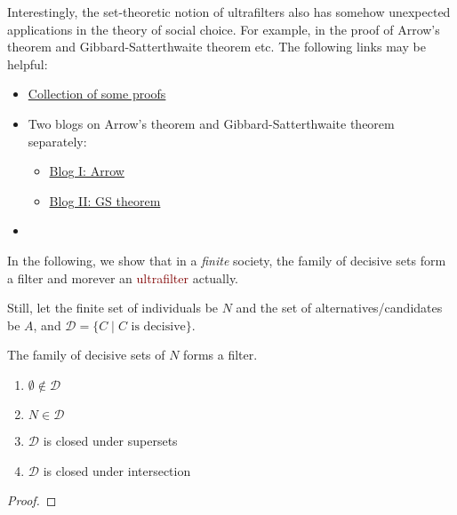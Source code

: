 Interestingly, the set-theoretic notion of ultrafilters also has somehow unexpected applications in the theory of social choice. For example, in the proof of Arrow's theorem and Gibbard-Satterthwaite theorem etc. The following links may be helpful:
\begin{itemize}
    \item \href{https://math.stackexchange.com/questions/585110/arrows-impossibility-theorem-and-ultrafilters-references}{Collection of some proofs}
    \item Two blogs on Arrow's theorem and Gibbard-Satterthwaite theorem separately:
    \begin{itemize}
        \item \href{https://algorithmicallyincompressible.wordpress.com/2009/08/11/ultrafilters-and-social-choice/#more-95}{Blog I: Arrow}
        \item \href{https://algorithmicallyincompressible.wordpress.com/2009/11/05/ultrafilters-and-social-choice-ii/}{Blog II: GS theorem}
    \end{itemize}
    \item 
\end{itemize}
In the following, we show that in a \emph{finite} society, the family of decisive sets form a filter and morever an \textcolor{Maroon}{ultrafilter} actually.

Still, let the finite set of individuals be $N$ and the set of alternatives/candidates be $A$, and $\mathcal{D}=\{C\mid C \text{ is decisive}\}$. 

\begin{lemma} The family of decisive sets of $N$ forms a filter.
    \begin{enumerate}
        \item $\emptyset \notin \mathcal{D}$
        \item $N \in \mathcal{D}$
        \item $\mathcal{D}$ is closed under supersets
        \item $\mathcal{D}$ is closed under intersection
    \end{enumerate}
\end{lemma}
\begin{proof}
    
\end{proof}